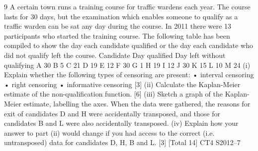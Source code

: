 \documentclass[a4paper,12pt]{article}
\begin{document}
9 A certain town runs a training course for traffic wardens each year. The course lasts
for 30 days, but the examination which enables someone to qualify as a traffic warden
can be sat any day during the course. In 2011 there were 13 participants who started
the training course. The following table has been compiled to show the day each
candidate qualified or the day each candidate who did not qualify left the course.
Candidate Day qualified Day left without
qualifying
A 30
B 5
C 21
D 19
E 12
F 30
G 1
H 19
I 12
J 30
K 15
L 10
M 24
(i) Explain whether the following types of censoring are present:
• interval censoring
• right censoring
• informative censoring
[3]
(ii) Calculate the Kaplan-Meier estimate of the non-qualification function. [6]
(iii) Sketch a graph of the Kaplan-Meier estimate, labelling the axes. 
When the data were gathered, the reasons for exit of candidates D and H were
accidentally transposed, and those for candidates B and L were also accidentally
transposed.
(iv) Explain how your answer to part (ii) would change if you had access to the
correct (i.e. untransposed) data for candidates D, H, B and L. [3]
[Total 14]
CT4 S2012–7
\end{document}

